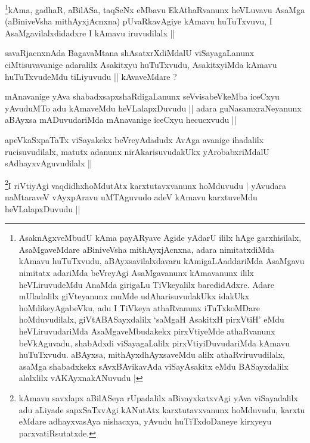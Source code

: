 \begin{artha}
\footnote{AsaknAgxveMbudU kAma payARyave Agide yAdarU ililx hAge garxhisilalx,
AsaMgaveMdare aBiniveVsha mithAyxjAcnxna, adara nimitatxdiMda kAmavu
huTuTxvudu, aBAyxsavilalxdavaru kAmigaLAaddariMda AsaMgavu
nimitatx adariMda beVreyAgi AsaMgavanunx kAmavanunx ililx
heVLiruvudeMdu AnaMda girigaLu TiVkeyalilx baredidAdxre. Adare
mUladalilx giVteyanunx muMde udAharisuvudakUkx idakUkx
hoMdikeyAgabeVku, adu I TiVkeya athaRvanunx iTuTxkoMDare
hoMduvudilalx, giVtABASayxdalilx `saMgaH AsakitxH pirxVtiH' eMdu
heVLiruvudariMda AsaMgaveMbudakekx pirxVtiyeMde athaRvanunx
beVkAguvadu, shabAdxdi viSayagaLalilx  pirxVtiyiDuvudariMda kAmavu
huTuTxvudu. aBAyxsa, mithAyxdhAyxsaveMdu alilx athaRviruvudilalx,
asaMga shabadxkekx sAvxBAvikavAda viSayAsakitx eMdu BASayxdalilx
alalxlilx vAKAyxnakANuvudu |}kAma, gadhaR, aBilASa, taqSeNx eMbavu EkAthaRvanunx
heVLuvavu AsaMga (aBiniveVsha mithAyxjAcnxna) pUvaRkavAgiye kAmavu
huTuTxvuvu, I AsaMgavilalxdidadxre I kAmavu iruvudilalx ||
\end{artha}


\begin{artha}
savaRjacnxnAda BagavaMtana shAsatxrXdiMdalU viSayagaLanunx
ciMtisuvavanige adaralilx Asakitxyu huTuTxvudu, AsakitxyiMda kAmavu
huTuTxvudeMdu tiLiyuvudu || kAvaveMdare ?
\end{artha}

\begin{artha}
mAnavanige yAva shabadxsapxshaRdigaLanunx seVvisabeVkeMba iceCxyu
yAvuduMTo adu kAmaveMdu heVLalapxDuvudu || adara guNasamxraNeyanunx
aBAyxsa mADuvudariMda mAnavanige iceCxyu hecucxvudu ||
\end{artha}

\begin{artha}
apeVkaSxpaTaTx viSayakekx beVreyAdadudx AvAga avanige ihadalilx
rucisuvudilalx, matutx adanunx nirAkarisuvudakUkx yArobabxriMdalU
sAdhayxvAguvudilalx ||
\end{artha}


\begin{artha}
\footnote{kAmavu savxlapx aBilASeya rUpadalilx aBivayxkatxvAgi yAva
  viSayadalilx adu aLiyade sapxSaTxvAgi kANutAtx karxtutavxvanunx
  hoMduvudu, karxtu eMdare adhayxvasAya nishacxya, yAvudu
  huTiTxdoDaneye kirxyeyu parxvatiRsutatxde.}I riVtiyAgi vaqdidhxhoMdutAtx karxtutavxvanunx hoMduvudu | yAvudara
naMtaraveV vAyxpAravu uMTAguvudo adeV kAmavu karxtuveMdu
heVLalapxDuvudu ||
\end{artha}

